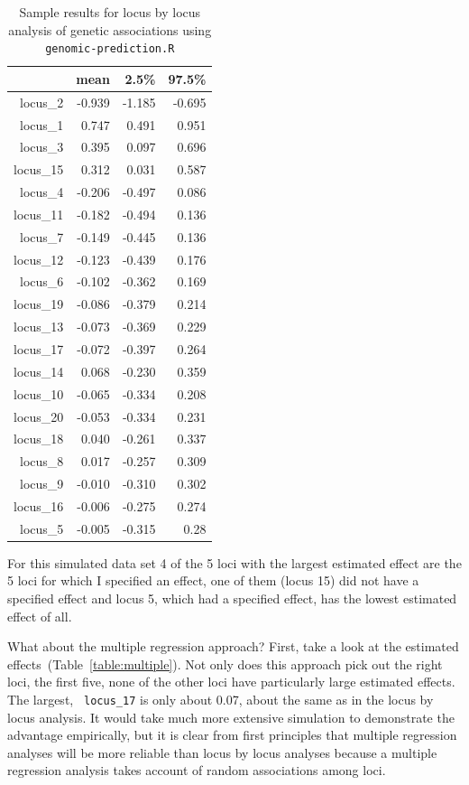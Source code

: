 \begin{table}
  \centering
\begin{tabular}{rrrr}
  \hline
 & mean & 2.5\% & 97.5\% \\ 
  \hline
locus\_2  & -0.939 & -1.185 & -0.695 \\
locus\_1  & 0.747  & 0.491  & 0.951 \\
locus\_3  & 0.395  & 0.097  & 0.696 \\
locus\_15 & 0.312  & 0.031  & 0.587 \\
locus\_4  & -0.206 & -0.497 & 0.086 \\
locus\_11 & -0.182 & -0.494 & 0.136 \\
locus\_7  & -0.149 & -0.445 & 0.136 \\
locus\_12 & -0.123 & -0.439 & 0.176 \\
locus\_6  & -0.102 & -0.362 & 0.169 \\
locus\_19 & -0.086 & -0.379 & 0.214 \\
locus\_13 & -0.073 & -0.369 & 0.229 \\
locus\_17 & -0.072 & -0.397 & 0.264 \\
locus\_14 & 0.068  & -0.230 & 0.359 \\
locus\_10 & -0.065 & -0.334 & 0.208 \\
locus\_20 & -0.053 & -0.334 & 0.231 \\
locus\_18 & 0.040  & -0.261 & 0.337 \\
locus\_8  & 0.017  & -0.257 & 0.309 \\
locus\_9  & -0.010 & -0.310 & 0.302 \\
locus\_16 & -0.006 & -0.275 & 0.274 \\
locus\_5  & -0.005 & -0.315 & 0.28 \\
  \hline
\end{tabular}
\caption{Sample results for locus by locus analysis of genetic
  associations using {\tt genomic-prediction.R}}\label{table:single}
\end{table}

For this simulated data set 4 of the 5 loci with the largest estimated
effect are the 5 loci for which I specified an effect, one of them
(locus 15) did not have a specified effect and locus 5, which had a
specified effect, has the lowest estimated effect of all. 

What about the multiple regression approach? First, take a look at the
estimated effects~(Table~\ref{table:multiple}). Not only does this
approach pick out the right loci, the first five, none of the other
loci have particularly large estimated effects. The largest, {\tt
  locus\_17} is only about 0.07, about the same as in the locus by
locus analysis. It would take much more extensive simulation to
demonstrate the advantage empirically, but it is clear from first
principles that multiple regression analyses will be more reliable
than locus by locus analyses because a multiple regression analysis
takes account of random associations among loci.

